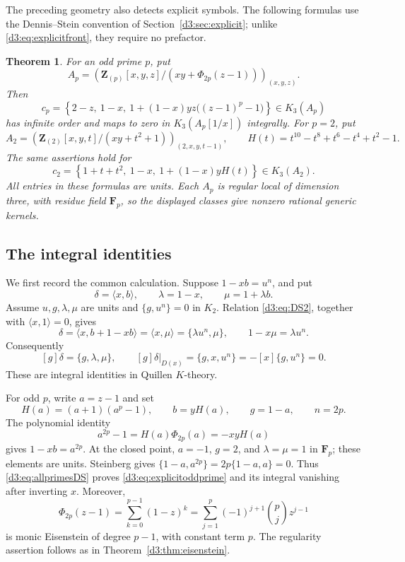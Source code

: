 \documentclass[11pt,a4paper]{amsart}
\numberwithin{equation}{section}
\newtheorem{theorem}{Theorem}[section]
\theoremstyle{definition}
\theoremstyle{remark}
\newcommand{\Z}{\mathbf Z}
\newcommand{\F}{\mathbf F}
\begin{document}
The preceding geometry also detects explicit symbols. The following formulas use the Dennis--Stein convention of Section~\ref{d3:sec:explicit}; unlike \eqref{d3:eq:explicitfront}, they require no prefactor.

\begin{theorem}\label{d3:thm:explicitallprimes}
For an odd prime $p$, put
\[
 A_p=\left(\Z_{(p)}[x,y,z]/(xy+\Phi_{2p}(z-1))\right)_{(x,y,z)}.
\]
Then
\begin{equation}\label{d3:eq:explicitoddprime}
 c_p=\left\{2-z,\ 1-x,\
 1+(1-x)yz\bigl((z-1)^p-1\bigr)\right\}\in K_3(A_p)
\end{equation}
has infinite order and maps to zero in $K_3(A_p[1/x])$ integrally.
For $p=2$, put
\[
 A_2=\left(\Z_{(2)}[x,y,t]/(xy+t^2+1)\right)_{(2,x,y,t-1)},
 \qquad H(t)=t^{10}-t^8+t^6-t^4+t^2-1.
\]
The same assertions hold for
\begin{equation}\label{d3:eq:explicittwoprime}
 c_2=\left\{1+t+t^2,\ 1-x,\ 1+(1-x)yH(t)\right\}\in K_3(A_2).
\end{equation}
All entries in these formulas are units. Each $A_p$ is regular local of dimension three, with residue field $\F_p$, so the displayed classes give nonzero rational generic kernels.
\end{theorem}

\subsection{The integral identities}

We first record the common calculation. Suppose $1-xb=u^n$, and put
\[
 \delta=\langle x,b\rangle,\qquad \lambda=1-x,\qquad
 \mu=1+\lambda b.
\]
Assume $u,g,\lambda,\mu$ are units and $\{g,u^n\}=0$ in $K_2$.
Relation \eqref{d3:eq:DS2}, together with $\langle x,1\rangle=0$, gives
\[
 \delta=\langle x,b+1-xb\rangle=\langle x,\mu\rangle
       =\{\lambda u^n,\mu\},
 \qquad 1-x\mu=\lambda u^n.
\]
Consequently
\begin{equation}\label{d3:eq:allprimesDS}
 [g]\delta=\{g,\lambda,\mu\},\qquad
 [g]\delta|_{D(x)}=\{g,x,u^n\}=-[x]\{g,u^n\}=0.
\end{equation}
These are integral identities in Quillen $K$-theory.

For odd $p$, write $a=z-1$ and set
\[
 H(a)=(a+1)(a^p-1),\qquad b=yH(a),\qquad g=1-a,\qquad n=2p.
\]
The polynomial identity
\[
 a^{2p}-1=H(a)\Phi_{2p}(a)=-xyH(a)
\]
gives $1-xb=a^{2p}$. At the closed point,
$a=-1$, $g=2$, and $\lambda=\mu=1$ in $\F_p$; these elements are units.
Steinberg gives $\{1-a,a^{2p}\}=2p\{1-a,a\}=0$.
Thus \eqref{d3:eq:allprimesDS} proves \eqref{d3:eq:explicitoddprime} and its integral vanishing after inverting $x$.
Moreover,
\[
 \Phi_{2p}(z-1)
 =\sum_{k=0}^{p-1}(1-z)^k
 =\sum_{j=1}^{p}(-1)^{j+1}\binom pj z^{j-1}
\]
is monic Eisenstein of degree $p-1$, with constant term $p$. The regularity assertion follows as in Theorem~\ref{d3:thm:eisenstein}.
\end{document}
